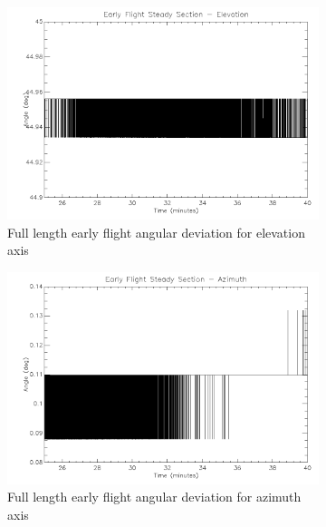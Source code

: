 {\begin{figure}[h!]
\captionsetup[subfigure]{justification=centering}
\captionsetup{justification=centering}
    \centering
	\begin{subfigure}{0.45\textwidth}
		\includegraphics[width=1\linewidth]{appendix/img/campaign_results/earlyalt.png}
		\caption{Full length early flight angular deviation for elevation axis}
		\label{fig:sub:earlyalt}
	\end{subfigure}
	\begin{subfigure}{0.45\textwidth}
		\includegraphics[width=1\linewidth]{appendix/img/campaign_results/earlyaz.png}
		\caption{Full length early flight angular deviation for azimuth axis}
		\label{fig:sub:earlyaz}
	\end{subfigure}
	\begin{subfigure}{0.45\textwidth}

\end{subfigure}
\end{figure}}
